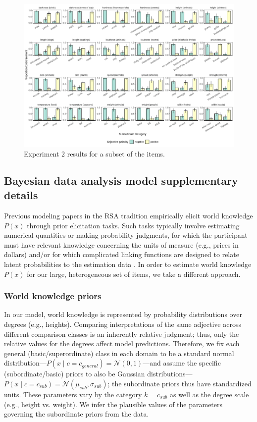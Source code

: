\documentclass[doc]{apa6}
\begin{document}
\begin{figure}[t!]
\centering
\includegraphics[width=\textwidth]{figs/bars_adj_finalExpt_pilot_byItem.pdf}
\caption{Experiment 2 results for a subset of the items.}\label{fig:adjEndorseItems}
\end{figure}

\subsection{Bayesian data analysis model supplementary details}

Previous modeling papers in the RSA tradition empirically elicit world knowledge $P(x)$ through prior elicitation tasks.
Such tasks typically involve estimating numerical quantities or making probability judgments, for which the participant must have relevant knowledge concerning the units of measure (e.g., prices in dollars) and/or for which complicated linking functions are designed to relate latent probabilities to the estimation data \cite{Franke2016}. 
In order to estimate world knowledge $P(x)$ for our large, heterogeneous set of items, we take a different approach.

\subsubsection{World knowledge priors}

In our model, world knowledge is represented by probability distributions over degrees (e.g., heights).
Comparing interpretations of the same adjective across different comparison classes is an inherently relative judgment; thus, only the relative values for the degrees affect model predictions. 
Therefore, we fix each general (basic/superordinate) class in each domain to be a standard normal distribution---$P(x \mid c = c_{general}) = \mathcal{N}(0, 1)$---and assume the specific (subordinate/basic) priors to also be Gaussian distributions---\(P(x \mid c = c_{sub}) = \mathcal{N}(\mu_{sub}, \sigma_{sub})\); the subordinate priors thus have standardized units.
These parameters vary by the category $k = c_{sub}$ as well as the degree scale (e.g., height vs. weight).
We infer the plausible values of the parameters governing the subordinate priors from the data.
\end{document}
